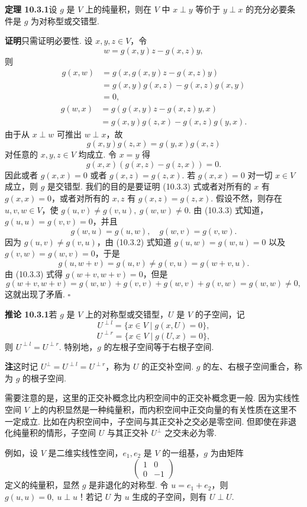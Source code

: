 \documentclass[UTF8,12pt,a4paper,fontset=fandol]{ctexart}
\begin{document}
\noindent\textbf{定理 10.3.1}\quad 设 $g$ 是 $V$ 上的纯量积，则在 $V$ 中 $x\perp y$ 等价于 $y\perp x$ 的充分必要条件是 $g$ 为对称型或交错型.

\noindent\textbf{证明}\quad 只需证明必要性. 设 $x,y,z\in V$，令
\[
  w=g(x,y)z-g(x,z)y,
\]
则
\[
\begin{aligned}
  g(x,w)&=g(x,g(x,y)z-g(x,z)y)\\
  &=g(x,y)g(x,z)-g(x,z)g(x,y)\\
  &=0,
\end{aligned}
\]
\[
\begin{aligned}
  g(w,x)&=g(g(x,y)z-g(x,z)y,x)\\
  &=g(x,y)g(z,x)-g(x,z)g(y,x).
\end{aligned}
\]
由于从 $x\perp w$ 可推出 $w\perp x$，故
\begin{equation}
  g(x,y)g(z,x)=g(y,x)g(x,z)
  \tag{10.3.2}
\end{equation}
对任意的 $x,y,z\in V$ 均成立. 令 $x=y$ 得
\begin{equation}
  g(x,x)(g(x,z)-g(z,x))=0.
  \tag{10.3.3}
\end{equation}
因此或者 $g(x,x)=0$ 或者 $g(x,z)=g(z,x)$. 若 $g(x,x)=0$ 对一切 $x\in V$ 成立，则 $g$ 是交错型. 我们的目的是要证明 (10.3.3) 式或者对所有的 $x$ 有 $g(x,x)=0$，或者对所有的 $x,z$ 有 $g(x,z)=g(z,x)$. 假设不然，则存在 $u,v,w\in V$，使 $g(u,v)\ne g(v,u),\ g(w,w)\ne0$. 由 (10.3.3) 式知道，$g(u,u)=g(v,v)=0$，并且
\[
  g(w,u)=g(u,w),\quad g(w,v)=g(v,w).
\]
因为 $g(u,v)\ne g(v,u)$，由 (10.3.2) 式知道 $g(u,w)=g(w,u)=0$ 以及 $g(v,w)=g(w,v)=0$，于是
\[
  g(u,w+v)=g(u,v)\ne g(v,u)=g(w+v,u).
\]
由 (10.3.3) 式得 $g(w+v,w+v)=0$，但是
\[
  g(w+v,w+v)=g(w,w)+g(v,v)+g(w,v)+g(v,w)=g(w,w)\ne0,
\]
这就出现了矛盾. $\square$

\noindent\textbf{推论 10.3.1}\quad 若 $g$ 是 $V$ 上的对称型或交错型，$U$ 是 $V$ 的子空间，记
\[
  U^{\perp l}=\{x\in V\mid g(x,U)=0\},
\]
\[
  U^{\perp r}=\{x\in V\mid g(U,x)=0\},
\]
则 $U^{\perp l}=U^{\perp r}$. 特别地，$g$ 的左根子空间等于右根子空间.

\noindent\textbf{注}\quad 这时记 $U^\perp=U^{\perp l}=U^{\perp r}$，称为 $U$ 的正交补空间. $g$ 的左、右根子空间重合，称为 $g$ 的根子空间.

需要注意的是，这里的正交补概念比内积空间中的正交补概念更一般. 因为实线性空间 $V$ 上的内积显然是一种纯量积，而内积空间中正交向量的有关性质在这里不一定成立. 比如在内积空间中，子空间与其正交补之交必是零空间. 但即使在非退化纯量积的情形，子空间 $U$ 与其正交补 $U^\perp$ 之交未必为零.

例如，设 $V$ 是二维实线性空间，$e_1,e_2$ 是 $V$ 的一组基，$g$ 为由矩阵
\[
  \left(\begin{array}{cc}
  1&0\\
  0&-1
  \end{array}\right)
\]
定义的纯量积，显然 $g$ 是非退化的对称型. 令 $u=e_1+e_2$，则 $g(u,u)=0,\ u\perp u$！若记 $U$ 为 $u$ 生成的子空间，则有 $U\perp U$.
\end{document}
